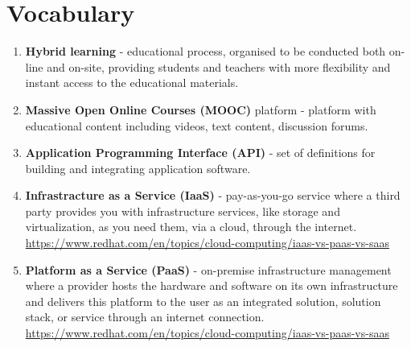 \documentclass[a4paper,11pt,twoside]{report}
\theoremstyle{definition}
\begin{document}

\null\thispagestyle{empty}\newpage
\pagestyle{fancy}
\setcounter{page}{11}

\chapter*{Vocabulary}


\begin{enumerate}
\item \textbf{Hybrid learning} - educational process, organised to be conducted both on-line and on-site, providing students and teachers with more flexibility and instant access to the educational materials.
\item \textbf{Massive Open Online Courses (MOOC)} platform - platform with educational content including videos, text content, discussion forums.
\item \textbf{Application Programming Interface (API)} - set of definitions for building and integrating application software.
\item \textbf{Infrastracture as a Service (IaaS)} - pay-as-you-go service where a third party provides you with infrastructure services, like storage and virtualization, as you need them, via a cloud, through the internet. \href{https://www.redhat.com/en/topics/cloud-computing/iaas-vs-paas-vs-saas}{https://www.redhat.com/en/topics/cloud-computing/iaas-vs-paas-vs-saas}
\item \textbf{Platform as a Service (PaaS)} - on-premise infrastructure management where a provider hosts the hardware and software on its own infrastructure and delivers this platform to the user as an integrated solution, solution stack, or service through an internet connection. \href{https://www.redhat.com/en/topics/cloud-computing/iaas-vs-paas-vs-saas}{https://www.redhat.com/en/topics/cloud-computing/iaas-vs-paas-vs-saas}
\end{enumerate}
\end{document}
